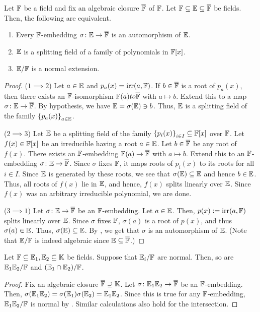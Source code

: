 \begin{theorem} \label{thm:normality-automorphic-embedding}
    Let $\mathbb{F}$ be a field and fix an algebraic closure $\overline{\mathbb{F}}$ of $\mathbb{F}$. Let $\mathbb{F} \subseteq \mathbb{E} \subseteq \overline{\mathbb{F}}$ be fields. Then, the following are equivalent. 
    \begin{enumerate}
        \item Every $\mathbb{F}$-embedding $\sigma \colon \mathbb{E} \to \overline{\mathbb{F}}$ is an automorphism of $\mathbb{E}$.
        \item $\mathbb{E}$ is a splitting field of a family of polynomials in $\mathbb{F}[x]$.
        \item $\mathbb{E}/\mathbb{F}$ is a normal extension.
    \end{enumerate}
\end{theorem}
\begin{proof}
    ($1 \implies 2$) Let $a \in \mathbb{E}$ and $p_a(x) = \operatorname{irr}(a,\mathbb{F})$. If $b \in \overline{\mathbb{F}}$ is a root of $p_a(x)$, then there exists an $\mathbb{F}$-isomorphism $\mathbb{F}(a) to \overline{\mathbb{F}}$ with $a \mapsto b$. Extend this to a map $\sigma \colon \mathbb{E} \to \overline{\mathbb{F}}$. By hypothesis, we have $\mathbb{E} = \sigma(\mathbb{E}) \ni b$. Thus, $\mathbb{E}$ is a splitting field of the family $\left\{ p_a(x) \right\}_{a \in \mathbb{E}}$.
    
    ($2 \implies 3$) Let $\mathbb{E}$ be a splitting field of the family $\left\{ p_i(x) \right\}_{i \in I} \subseteq \mathbb{F}[x]$ over $\mathbb{F}$. Let $f(x) \in \mathbb{F}[x]$ be an irreducible having a root $a \in \mathbb{E}$. Let $b \in \overline{\mathbb{F}}$ be any root of $f(x)$. There exists an $\mathbb{F}$-embedding $\mathbb{F}(a) \to \overline{\mathbb{F}}$ with $a \mapsto b$. Extend this to an $\mathbb{F}$-embedding $\sigma \colon \mathbb{E} \to \overline{\mathbb{F}}$. Since $\sigma$ fixes $\mathbb{F}$, it maps roots of $p_i(x)$ to its roots for all $i \in I$. Since $\mathbb{E}$ is generated by these roots, we see that $\sigma(\mathbb{E}) \subseteq \mathbb{E}$ and hence $b \in \mathbb{E}$. Thus, all roots of $f(x)$ lie in $\mathbb{E}$, and hence, $f(x)$ splits linearly over $\mathbb{E}$. Since $f(x)$ was an arbitrary irreducible polynomial, we are done.
    
    ($3 \implies 1$) Let $\sigma \colon \mathbb{E} \to \overline{\mathbb{F}}$ be an $\mathbb{F}$-embedding. Let $a \in \mathbb{E}$. Then, $p(x) \vcentcolon= \operatorname{irr}(a, \mathbb{F})$ splits linearly over $\mathbb{E}$. Since $\sigma$ fixes $\mathbb{F}$, $\sigma(a)$ is a root of $p(x)$, and thus $\sigma(a) \in \mathbb{E}$. Thus, $\sigma(\mathbb{E}) \subseteq \mathbb{E}$. By , we get that $\sigma$ is an automorphism of $\mathbb{E}$. (Note that $\mathbb{E}/\mathbb{F}$ is indeed algebraic since $\mathbb{E} \subseteq \overline{\mathbb{F}}$.)
\end{proof}

\begin{prop}
    Let $\mathbb{F} \subseteq \mathbb{E}_1, \mathbb{E}_2 \subseteq \mathbb{K}$ be fields. Suppose that $\mathbb{E}_i/\mathbb{F}$ are normal. Then, so are $\mathbb{E}_1\mathbb{E}_2/\mathbb{F}$ and $(\mathbb{E}_1 \cap \mathbb{E}_2) / \mathbb{F}$.
\end{prop}
\begin{proof}
    Fix an algebraic closure $\overline{\mathbb{F}} \supseteq \mathbb{K}$. Let $\sigma \colon \mathbb{E}_1 \mathbb{E}_2 \to \overline{\mathbb{F}}$ be an $\mathbb{F}$-embedding. Then, $\sigma(\mathbb{E}_1 \mathbb{E}_2) = \sigma(\mathbb{E}_1) \sigma(\mathbb{E}_2) = \mathbb{E}_1 \mathbb{E}_2$. Since this is true for any $\mathbb{F}$-embedding, $\mathbb{E}_1\mathbb{E}_2/\mathbb{F}$ is normal by . Similar calculations also hold for the intersection.
\end{proof}

